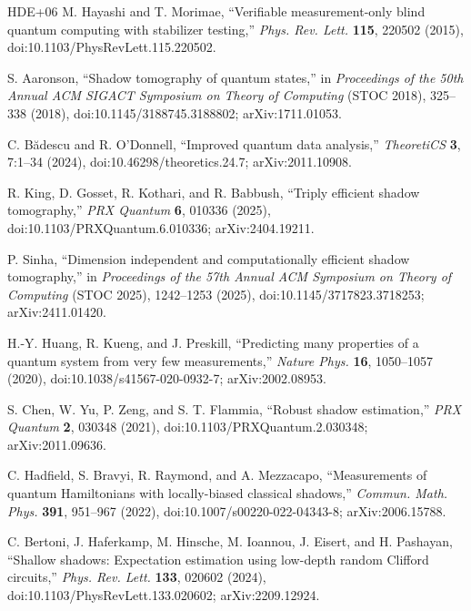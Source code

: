 \documentclass[11pt]{article}
\newcommand{\1}{\mathbf 1}
\theoremstyle{plain}
\theoremstyle{definition}
\theoremstyle{remark}
\begin{document}
\begin{thebibliography}{HDE+06}
M. Hayashi and T. Morimae,
``Verifiable measurement-only blind quantum computing with stabilizer testing,''
\emph{Phys. Rev. Lett.} \textbf{115}, 220502 (2015),
doi:10.1103/PhysRevLett.115.220502.

S. Aaronson, ``Shadow tomography of quantum states,''
in \emph{Proceedings of the 50th Annual ACM SIGACT Symposium on Theory of
Computing} (STOC 2018), 325--338 (2018),
doi:10.1145/3188745.3188802; arXiv:1711.01053.

C. B{\u{a}}descu and R. O'Donnell, ``Improved quantum data analysis,''
\emph{TheoretiCS} \textbf{3}, 7:1--34 (2024),
doi:10.46298/theoretics.24.7; arXiv:2011.10908.

R. King, D. Gosset, R. Kothari, and R. Babbush,
``Triply efficient shadow tomography,''
\emph{PRX Quantum} \textbf{6}, 010336 (2025),
doi:10.1103/PRXQuantum.6.010336; arXiv:2404.19211.

P. Sinha, ``Dimension independent and computationally efficient shadow
tomography,'' in \emph{Proceedings of the 57th Annual ACM Symposium on Theory
of Computing} (STOC 2025), 1242--1253 (2025),
doi:10.1145/3717823.3718253; arXiv:2411.01420.

H.-Y. Huang, R. Kueng, and J. Preskill,
``Predicting many properties of a quantum system from very few
measurements,'' \emph{Nature Phys.} \textbf{16}, 1050--1057 (2020),
doi:10.1038/s41567-020-0932-7; arXiv:2002.08953.

S. Chen, W. Yu, P. Zeng, and S. T. Flammia,
``Robust shadow estimation,'' \emph{PRX Quantum} \textbf{2}, 030348 (2021),
doi:10.1103/PRXQuantum.2.030348; arXiv:2011.09636.

C. Hadfield, S. Bravyi, R. Raymond, and A. Mezzacapo,
``Measurements of quantum Hamiltonians with locally-biased classical
shadows,'' \emph{Commun. Math. Phys.} \textbf{391}, 951--967 (2022),
doi:10.1007/s00220-022-04343-8; arXiv:2006.15788.

C. Bertoni, J. Haferkamp, M. Hinsche, M. Ioannou, J. Eisert, and H. Pashayan,
``Shallow shadows: Expectation estimation using low-depth random Clifford
circuits,'' \emph{Phys. Rev. Lett.} \textbf{133}, 020602 (2024),
doi:10.1103/PhysRevLett.133.020602; arXiv:2209.12924.


\end{thebibliography}
\end{document}
